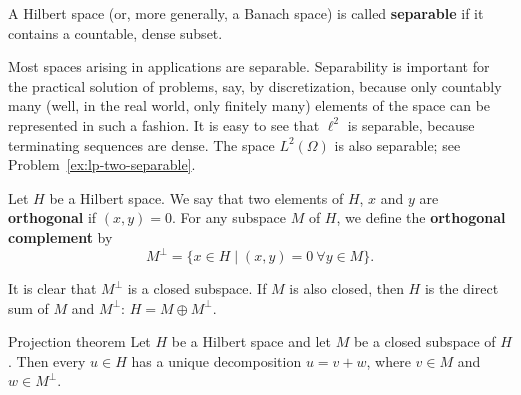 \begin{Definition}
\label{def:separable-space}
A Hilbert space (or, more generally, a Banach space) is called \textbf{separable} if it contains a countable, dense subset.
\end{Definition}

Most spaces arising in applications are separable. Separability is important for the practical solution of problems, say, by discretization, because only countably many (well, in the real world, only finitely many) elements of the space can be represented in such a fashion. It is easy to see that $\ell^2$ is separable, because terminating sequences are dense. The space $L^2(\Omega)$ is also separable; see Problem~\ref{ex:lp-two-separable}.

\begin{Definition}
\label{def:hilbert-orthogonal-complement}
Let $H$ be a Hilbert space. We say that two elements of $H$, $x$ and $y$ are \textbf{orthogonal} if $(x,y)=0$. For any subspace $M$ of $H$, we define the \textbf{orthogonal complement} by
\begin{equation}\label{eq:hilbert-subspace-orthogonal-complement}
M^\perp=\{x\in H\mid(x,y)=0\ \forall y\in M\}.
\end{equation}

\end{Definition}

It is clear that $M^\perp$ is a closed subspace. If $M$ is also closed, then $H$ is the direct sum of $M$ and $M^\perp$: $H=M\oplus M^\perp$.

\begin{Theorem}{Projection theorem}
\label{thm:hilbert-orthogonal-projection}
Let $H$ be a Hilbert space and let $M$ be a closed subspace of $H$. Then every $u\in H$ has a unique decomposition $u=v+w$, where $v\in M$ and $w\in M^\perp$.
\end{Theorem}


